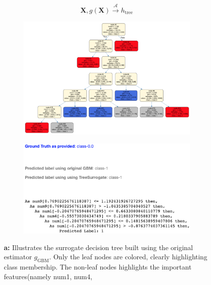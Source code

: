 \documentclass{article}
\begin{document}
\begin{equation}
\mathbf{X}, g(\mathbf{X}) \xrightarrow{\mathcal{A}} h_{\text{tree}}
\end{equation}

\begin{figure}[H]
	\begin{subfigure}[tb]{.5\textwidth}
		\begin{center}
			\includegraphics[width=\linewidth]{img/sdt_visualization}
			\caption{}
			\label{fig:surrogate_dt}
		\end{center}
	\end{subfigure}%
	\begin{subfigure}[tb]{.5\textwidth}
		\begin{center}
			\includegraphics[width=1.3\linewidth]{img/decision_stumps_txt}
			\caption{}
			\label{fig:surrogate_dt}
		\end{center}
	\end{subfigure}%
	\captionsetup{font=footnotesize}
	\caption{\textbf{a:} Illustrates the surrogate decision tree built using the original estimator $g_{\text{GBM}}$. Only the leaf nodes are colored, clearly highlighting class membership. The non-leaf nodes highlights the important features(namely num1, num4, 
}
\end{figure}
\end{document}
